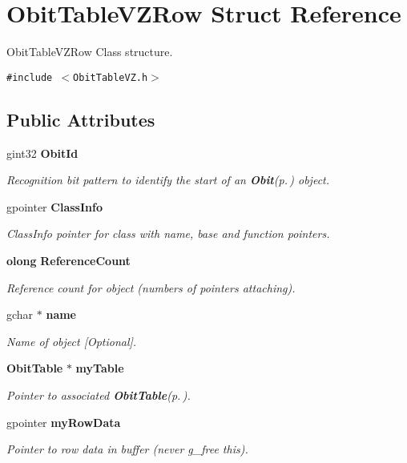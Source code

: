 \section{Obit\-Table\-VZRow Struct Reference}
\label{structObitTableVZRow}
Obit\-Table\-VZRow Class structure.  


{\tt \#include $<$Obit\-Table\-VZ.h$>$}

\subsection*{Public Attributes}
\begin{CompactItemize}
\item 
gint32 {\bf Obit\-Id}
\begin{CompactList}\small\item\em Recognition bit pattern to identify the start of an {\bf Obit}{\rm (p.\,\pageref{structObit})} object. \item\end{CompactList}\item 
gpointer {\bf Class\-Info}
\begin{CompactList}\small\item\em Class\-Info pointer for class with name, base and function pointers. \item\end{CompactList}\item 
{\bf olong} {\bf Reference\-Count}
\begin{CompactList}\small\item\em Reference count for object (numbers of pointers attaching). \item\end{CompactList}\item 
gchar $\ast$ {\bf name}
\begin{CompactList}\small\item\em Name of object [Optional]. \item\end{CompactList}\item 
{\bf Obit\-Table} $\ast$ {\bf my\-Table}
\begin{CompactList}\small\item\em Pointer to associated {\bf Obit\-Table}{\rm (p.\,\pageref{structObitTable})}. \item\end{CompactList}\item 
gpointer {\bf my\-Row\-Data}
\begin{CompactList}\small\item\em Pointer to row data in buffer (never g\_\-free this). \item\end{CompactList}\item 

\end{CompactItemize}
